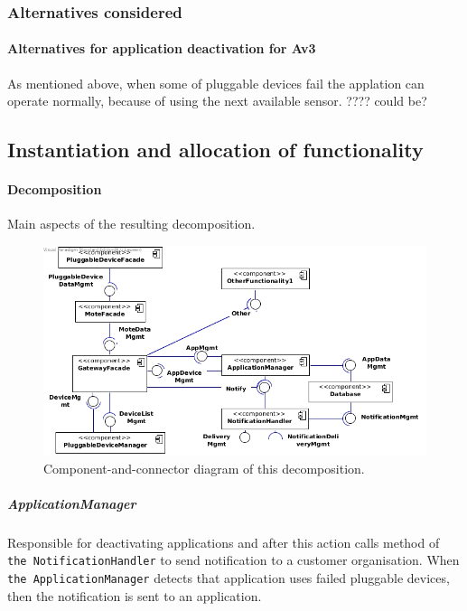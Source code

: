     \subsubsection{Alternatives considered}
        \paragraph{Alternatives for application deactivation for Av3}
            As mentioned above, when some of pluggable devices fail the applation can operate
            normally, because of using the next available sensor. ???? could be?


\subsection{Instantiation and allocation of functionality}
    \paragraph{Decomposition}
        Main aspects of the resulting decomposition.

        \begin{figure}[!htp]
        	\centering
        	\includegraphics[width=1.00\textwidth]{component-diagram-1}
        	\caption{Component-and-connector diagram of this decomposition.}
            \label{fig:it1-cc_main}
        \end{figure}

    \subparagraph{ApplicationManager}
        Responsible for deactivating applications and after this action calls method of 
        \texttt{the NotificationHandler} to send notification to a customer organisation.
        When \texttt{the ApplicationManager} detects that application uses failed pluggable devices, 
        then the notification is sent to an application.

